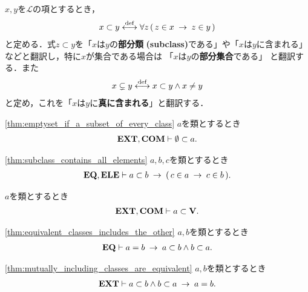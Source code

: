 	\begin{screen}
		\begin{dfn}[部分類]
			$x,y$を$\mathcal{L}$の項とするとき，
			\begin{align}
				x \subset y \overset{\mathrm{def}}{\longleftrightarrow}
				\forall z\, (\, z \in x \hspace{0.25em}\rightarrow\hspace{0.25em} z \in y\, )
			\end{align}
			と定める．式$z \subset y$を「$x$は$y$の{\bf 部分類}
			{\bf (subclass)}である」や「$x$は$y$に含まれる」などと翻訳し，特に$x$が集合である場合は
			「$x$は$y$の{\bf 部分集合}である」
			と翻訳する．また
			\begin{align}
				x \subsetneq y \overset{\mathrm{def}}{\longleftrightarrow} x \subset y \wedge x \neq y
			\end{align}
			と定め，これを「$x$は$y$に{\bf 真に含まれる}」と翻訳する．
		\end{dfn}
	\end{screen}
	
	\begin{screen}
		\begin{thm}[空集合は全ての類に含まれる]
		\ref{thm:emptyset_if_a_subset_of_every_class}
			$a$を類とするとき
			\begin{align}
				\mbox{{\bf EXT}},\mbox{\bf COM} \vdash \emptyset \subset a.
			\end{align}
		\end{thm}
	\end{screen}
	
	\begin{screen}
		\begin{thm}[類はその部分類に属する全ての類を要素に持つ]
		\ref{thm:subclass_contains_all_elements}
			$a,b,c$を類とするとき
			\begin{align}
				\mbox{{\bf EQ}},\mbox{{\bf ELE}} \vdash 
				a \subset b \hspace{0.25em}\rightarrow\hspace{0.25em} (\, c \in a \hspace{0.25em}\rightarrow\hspace{0.25em} c \in b\, ).
			\end{align}
		\end{thm}
	\end{screen}
	
	\begin{screen}
		\begin{thm}
			$a$を類とするとき
			\begin{align}
				\mbox{{\bf EXT}},\mbox{\bf COM} \vdash a \subset \mathbf{V}.
			\end{align}
		\end{thm}
	\end{screen}
	
	\begin{screen}
		\begin{thm}[等しい類は相手を包含する]
		\ref{thm:equivalent_classes_includes_the_other}
			$a,b$を類とするとき
			\begin{align}
				\mbox{{\bf EQ}} \vdash a = b \hspace{0.25em}\rightarrow\hspace{0.25em} a \subset b \wedge b \subset a.
			\end{align}
		\end{thm}
	\end{screen}
	
	\begin{screen}
		\begin{thm}[互いに相手を包含する類同士は等しい]
		\ref{thm:mutually_including_classes_are_equivalent}
			$a,b$を類とするとき
			\begin{align}
				\mbox{{\bf EXT}} \vdash a \subset b \wedge b \subset a \hspace{0.25em}\rightarrow\hspace{0.25em} a = b.
			\end{align}
		\end{thm}
	\end{screen}	